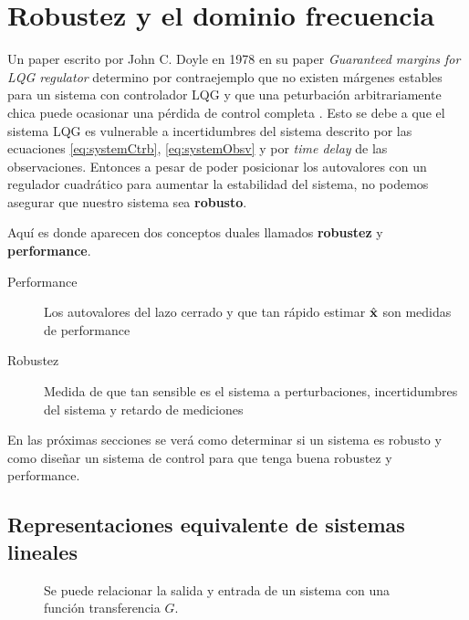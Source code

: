 
\chapter{Robustez y el dominio frecuencia}
Un paper escrito por John C. Doyle en 1978 en su paper \textit{Guaranteed margins for LQG regulator} determino por contraejemplo que no existen márgenes estables para un sistema con controlador LQG y que una peturbación arbitrariamente chica puede ocasionar una pérdida de control completa \citep{doyle1978guaranteed}. Esto se debe a que el sistema LQG es vulnerable a incertidumbres del sistema descrito por las ecuaciones \eqref{eq:systemCtrb}, \eqref{eq:systemObsv} y por \textit{time delay} de las observaciones. Entonces a pesar de poder posicionar los autovalores con un regulador cuadrático para aumentar la estabilidad del sistema, no podemos asegurar que nuestro sistema sea \textbf{robusto}.

Aquí es donde aparecen dos conceptos duales llamados \textbf{robustez} y \textbf{performance}. 

\begin{description}
	\item[Performance] Los autovalores del lazo cerrado y que tan rápido estimar $\hat{\mathbf{x}}$ son medidas de performance
	\item[Robustez] Medida de que tan sensible es el sistema a perturbaciones, incertidumbres del sistema y retardo de mediciones
\end{description}

En las próximas secciones se verá como determinar si un sistema es robusto y como diseñar un sistema de control para que tenga buena robustez y performance.

\section{Representaciones equivalente de sistemas lineales}

\begin{figure}[htb!]
	\centering
{}
\caption{Se puede relacionar la salida y entrada de un sistema con una función transferencia $G$.}
\end{figure}

